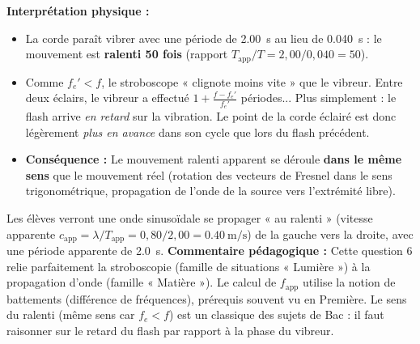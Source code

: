 \documentclass[11pt]{article}
\begin{document}
\begin{exoresolu}
\textbf{Interprétation physique :}
\begin{itemize}
    \item La corde paraît vibrer avec une période de \SI{2,00}{\second} au lieu de \SI{0,040}{\second} : le mouvement est \textbf{ralenti 50 fois} (rapport $T_{\text{app}}/T = 2,00/0,040 = 50$).
    \item Comme $f_e' < f$, le stroboscope « clignote moins vite » que le vibreur. Entre deux éclairs, le vibreur a effectué $1 + \frac{f - f_e'}{f_e'}$ périodes... Plus simplement : le flash arrive \emph{en retard} sur la vibration. Le point de la corde éclairé est donc légèrement \emph{plus en avance} dans son cycle que lors du flash précédent.
    \item \textbf{Conséquence :} Le mouvement ralenti apparent se déroule \textbf{dans le même sens} que le mouvement réel (rotation des vecteurs de Fresnel dans le sens trigonométrique, propagation de l'onde de la source vers l'extrémité libre).
\end{itemize}
Les élèves verront une onde sinusoïdale se propager « au ralenti » (vitesse apparente $c_{\text{app}} = \lambda / T_{\text{app}} = 0,80 / 2,00 = \SI{0,40}{\meter\per\second}$) de la gauche vers la droite, avec une période apparente de \SI{2,0}{\second}.
\tcblower
\textbf{Commentaire pédagogique :} Cette question 6 relie parfaitement la stroboscopie (famille de situations « Lumière ») à la propagation d'onde (famille « Matière »). Le calcul de $f_{\text{app}}$ utilise la notion de battements (différence de fréquences), prérequis souvent vu en Première. Le sens du ralenti (même sens car $f_e < f$) est un classique des sujets de Bac : il faut raisonner sur le retard du flash par rapport à la phase du vibreur.
\end{exoresolu}
\end{document}
